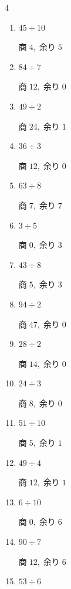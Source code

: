 \begin{multicols}{4}
\begin{enumerate}
  \item $45 \div 10$

        $商\; 4,\; 余り\; 5$

  \item $84 \div 7$

        $商\; 12,\; 余り\; 0$

  \item $49 \div 2$

        $商\; 24,\; 余り\; 1$

\columnbreak %

\resetques

  \item $36 \div 3$

        $商\; 12,\; 余り\; 0$

  \item $63 \div 8$

        $商\; 7,\; 余り\; 7$

  \item $3 \div 5$

        $商\; 0,\; 余り\; 3$

  \item $43 \div 8$

        $商\; 5,\; 余り\; 3$

  \item $94 \div 2$

        $商\; 47,\; 余り\; 0$

  \item $28 \div 2$

        $商\; 14,\; 余り\; 0$

  \item $24 \div 3$

        $商\; 8,\; 余り\; 0$

  \item $51 \div 10$

        $商\; 5,\; 余り\; 1$

  \item $49 \div 4$

        $商\; 12,\; 余り\; 1$

  \item $6 \div 10$

        $商\; 0,\; 余り\; 6$

  \item $90 \div 7$

        $商\; 12,\; 余り\; 6$

  \item $53 \div 6$


\end{enumerate}
\end{multicols}
